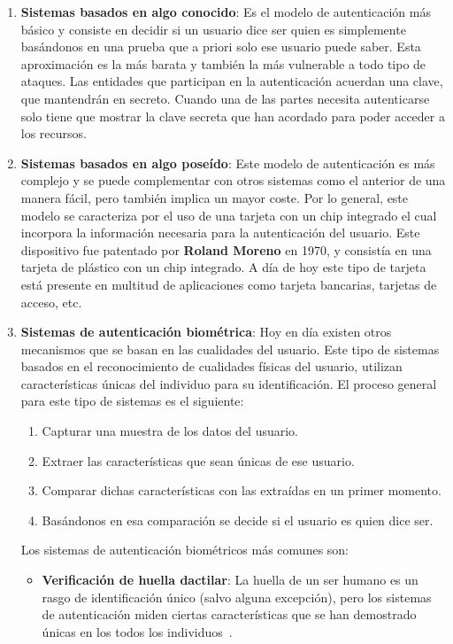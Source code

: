 \begin{enumerate}
    \item \textbf{Sistemas basados en algo conocido}: Es el modelo de autenticación más básico y consiste en decidir si un usuario dice ser quien es simplemente basándonos en una prueba que a priori solo ese usuario puede saber. Esta aproximación es la más barata y también la más vulnerable a todo tipo de ataques. Las entidades que participan en la autenticación acuerdan una clave, que mantendrán en secreto. Cuando una de las partes necesita autenticarse solo tiene que mostrar la clave secreta que han acordado para poder acceder a los recursos.

    \item \textbf{Sistemas basados en algo poseído}: Este modelo de autenticación es más complejo y se puede complementar con otros sistemas como el anterior de una manera fácil, pero también implica un mayor coste. Por lo general, este modelo se caracteriza por el uso de una tarjeta con un chip integrado el cual incorpora la información necesaria para la autenticación del usuario.
          Este dispositivo fue patentado por \textbf{Roland Moreno} en 1970, y consistía en una tarjeta de plástico con un chip integrado. A día de hoy este tipo de tarjeta está presente en multitud de aplicaciones como tarjeta bancarias, tarjetas de acceso, etc.
    \item \textbf{Sistemas de autenticación biométrica}: Hoy en día existen otros mecanismos que se basan en las cualidades del usuario.
          Este tipo de sistemas basados en el reconocimiento de cualidades físicas del usuario, utilizan características únicas del individuo para su identificación. El proceso general para este tipo de sistemas es el siguiente:
          \begin{enumerate}[label={\arabic*.}]
              \item Capturar una muestra de los datos del usuario.
              \item Extraer las características que sean únicas de ese usuario.
              \item Comparar dichas características con las extraídas en un primer momento.
              \item Basándonos en esa comparación se decide si el usuario es quien dice ser.
          \end{enumerate}

          Los sistemas de autenticación biométricos más comunes son:
          \begin{itemize}
              \item \textbf{Verificación de huella dactilar}: La huella de un ser humano es un rasgo de identificación único (salvo alguna excepción), pero los sistemas de autenticación miden ciertas características que se han demostrado únicas en los todos los individuos~\cite{mseg}.


\end{itemize}
\end{enumerate}
